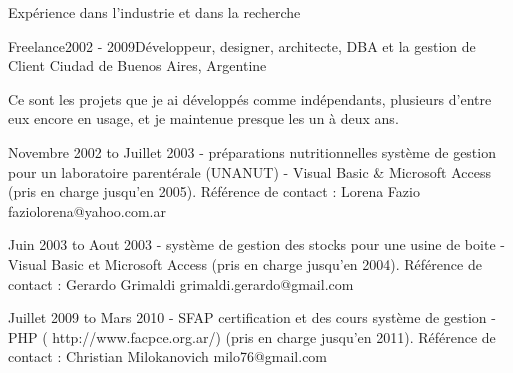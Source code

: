 \documentclass{resume} %
\begin{document}
\begin{rSection}{Exp\'{e}rience dans l'industrie et dans la recherche}
\begin{rSubsection}{Freelance}{2002 - 2009}{D\'{e}veloppeur, designer, architecte, DBA et la gestion de Client} {Ciudad de Buenos Aires, Argentine}
	\item Ce sont les projets que je ai d\'{e}velopp\'{e}s comme ind\'{e}pendants, plusieurs d'entre eux encore en usage, et je maintenue presque les un \`{a} deux ans.
	\item  Novembre 2002 to Juillet 2003 - pr\'{e}parations nutritionnelles syst\`{e}me de gestion pour un laboratoire parent\'{e}rale (UNANUT) - Visual Basic \& Microsoft Access (pris en charge jusqu'en 2005). R\'{e}f\'{e}rence de contact : Lorena Fazio faziolorena@yahoo.com.ar
	\item  Juin 2003 to Aout 2003 - syst\`{e}me de gestion des stocks pour une usine de boite - Visual Basic et Microsoft Access (pris en charge jusqu'en 2004). R\'{e}f\'{e}rence de contact : Gerardo Grimaldi grimaldi.gerardo@gmail.com
	\item Juillet 2009 to Mars 2010 - SFAP certification et des cours syst\`{e}me de gestion - PHP ( http://www.facpce.org.ar/) (pris en charge jusqu'en 2011). R\'{e}f\'{e}rence de contact : Christian Milokanovich milo76@gmail.com
\end{rSubsection}



\end{rSection}
\end{document}

